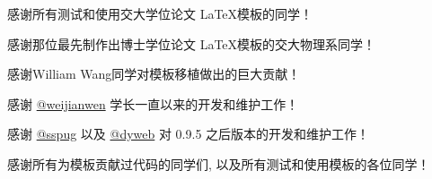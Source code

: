 \begin{thanks}

  感谢所有测试和使用交大学位论文 \LaTeX 模板的同学！

  感谢那位最先制作出博士学位论文 \LaTeX 模板的交大物理系同学！

  感谢William Wang同学对模板移植做出的巨大贡献！

  感谢 \href{https://github.com/weijianwen}{@weijianwen} 学长一直以来的开发和维护工作！

  感谢 \href{https://github.com/sspug}{@sspug} 以及 \href{https://github.com/dyweb}{@dyweb} 对 0.9.5 之后版本的开发和维护工作！

  感谢所有为模板贡献过代码的同学们, 以及所有测试和使用模板的各位同学！

\end{thanks}
